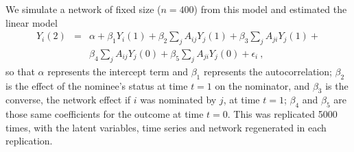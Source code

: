 \documentclass{article}
\begin{document}
\begin{multicols}{2}
We simulate a network of fixed size ($n=400$) from this model and estimated the
linear model
\begin{eqnarray*}
Y_i(2) & = & \alpha + \beta_1 Y_i(1) + \beta_2 \sum_j A_{ij}Y_j(1) + \beta_3 \sum_j A_{ji}Y_j(1) + \\
& & \beta_4 \sum_j A_{ij}Y_j(0) + \beta_5 \sum_j A_{ji}Y_j(0)+ \epsilon_i ~,
\end{eqnarray*}
so that $\alpha$ represents the intercept term and $\beta_1$ represents the
autocorrelation; $\beta_2$ is the effect of the nominee's status at time $t=1$
on the nominator, and $\beta_3$ is the converse, the network effect if $i$ was
nominated by $j$, at time $t=1$; $\beta_4$ and $\beta_5$ are those same
coefficients for the outcome at time $t=0$. This was replicated 5000 times,
with the latent variables, time series and network regenerated in each
replication.


\end{multicols}
\end{document}
